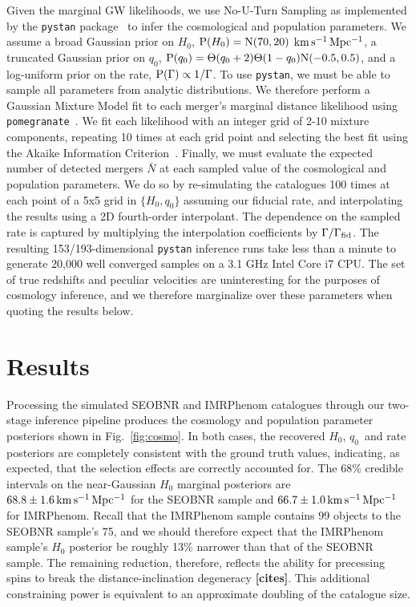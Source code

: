 \documentclass[%
 reprint,
 superscriptaddress,
 nofootinbib,
 amsmath,amssymb,
 aps,
]{revtex4-2}
\newcommand{\hubble}{\ensuremath{H_0}}
\newcommand{\decel}{\ensuremath{q_0}}
\newcommand{\prob}{\ensuremath{{\rm P}}}
\newcommand{\normal}{{\rm{N}}}
\newcommand{\nexp}{\bar{N}}
\newcommand{\rate}{\Gamma}
\newcommand{\step}{\Theta}
\newcommand{\kmsmpc}{\ensuremath{{\rm km\,s^{-1}\,Mpc^{-1}}}}
\begin{document}
Given the marginal GW likelihoods, we use No-U-Turn Sampling as implemented by the \texttt{pystan} package~\cite{pystan} to infer the cosmological and population parameters. We assume a broad Gaussian prior on \hubble, $\prob(\hubble)=\normal(70,20)$ \kmsmpc, a truncated Gaussian prior on \decel, $\prob(\decel)=\step(\decel+2)\step(1-\decel)\normal(-0.5,0.5)$, and a log-uniform prior on the rate, $\prob(\rate) \propto 1/\rate$. To use \texttt{pystan}, we must be able to sample all parameters from analytic distributions. We therefore perform a Gaussian Mixture Model fit to each merger's marginal distance likelihood using \texttt{pomegranate}~\cite{Schreiber:2017}. We fit each likelihood with an integer grid of 2-10 mixture components, repeating 10 times at each grid point and selecting the best fit using the Akaike Information Criterion~\cite{Akaike:1974}. Finally, we must evaluate the expected number of detected mergers $\nexp$ at each sampled value of the cosmological and population parameters. We do so by re-simulating the catalogues 100 times at each point of a 5x5 grid in $\{H_0,q_0\}$ assuming our fiducial rate, and interpolating the results using a 2D fourth-order interpolant. The dependence on the sampled rate is captured by multiplying the interpolation coefficients by $\Gamma/\Gamma_{\rm fid}$. The resulting 153/193-dimensional \texttt{pystan} inference runs take less than a minute to generate 20,000 well converged samples on a 3.1 GHz Intel Core i7 CPU. The set of true redshifts and peculiar velocities are uninteresting for the purposes of cosmology inference, and we therefore marginalize over these parameters when quoting the results below.


\section{Results} \label{sec:results}

Processing the simulated SEOBNR and IMRPhenom catalogues through our two-stage inference pipeline produces the cosmology and population parameter posteriors shown in Fig.~\ref{fig:cosmo}. In both cases, the recovered \hubble, \decel\ and rate posteriors are completely consistent with the ground truth values, indicating, as expected, that the selection effects are correctly accounted for. The 68\% credible intervals on the near-Gaussian $\hubble$ marginal posteriors are $68.8 \pm 1.6\,\kmsmpc$ for the SEOBNR sample and $66.7 \pm 1.0\,\kmsmpc$ for IMRPhenom. Recall that the IMRPhenom sample contains 99 objects to the SEOBNR sample's 75, and we should therefore expect that the IMRPhenom sample's $\hubble$ posterior be roughly 13\% narrower than that of the SEOBNR sample. The remaining reduction, therefore, reflects the ability for precessing spins to break the distance-inclination degeneracy {\bf [cites]}. This additional constraining power is equivalent to an approximate doubling of the catalogue size.
\end{document}
